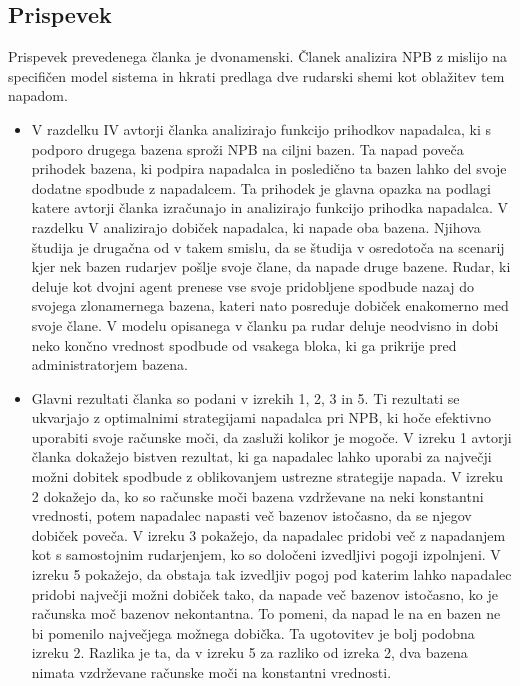 \documentclass{acm_proc_article-sp}
\begin{document}
\subsection{Prispevek}

Prispevek prevedenega članka \cite{originalarticle} je dvonamenski. Članek analizira NPB z mislijo na specifičen model sistema in hkrati predlaga dve rudarski shemi kot oblažitev tem napadom.
\begin{itemize}
	\item V razdelku IV avtorji članka \cite{originalarticle}  analizirajo funkcijo prihodkov napadalca, ki s podporo drugega bazena sproži NPB na ciljni bazen. Ta napad poveča prihodek bazena, ki podpira napadalca in posledično ta bazen lahko del svoje dodatne spodbude z napadalcem. Ta prihodek je glavna opazka na podlagi katere avtorji članka \cite{originalarticle}  izračunajo in analizirajo funkcijo prihodka napadalca. V razdelku V analizirajo dobiček napadalca, ki napade oba bazena.
	Njihova študija je drugačna od \cite{minnersdilemma} v takem smislu, da se študija v  \cite{minnersdilemma} osredotoča na scenarij kjer nek bazen rudarjev pošlje svoje člane, da napade druge bazene. Rudar, ki deluje kot dvojni agent prenese vse svoje pridobljene spodbude nazaj do svojega zlonamernega bazena, kateri nato posreduje dobiček enakomerno med svoje člane. V modelu opisanega v članku \cite{originalarticle} pa rudar deluje neodvisno in dobi neko končno vrednost spodbude od vsakega bloka, ki ga prikrije pred administratorjem bazena.
	\item Glavni rezultati članka so podani v izrekih 1, 2, 3 in 5. Ti rezultati se ukvarjajo z optimalnimi strategijami napadalca pri NPB, ki hoče efektivno uporabiti svoje računske moči, da zasluži kolikor je mogoče. V izreku 1 avtorji članka \cite{originalarticle} dokažejo bistven rezultat, ki ga napadalec lahko uporabi za največji možni dobitek spodbude z oblikovanjem ustrezne strategije napada. 
	V izreku 2 dokažejo da, ko so računske moči bazena vzdrževane na neki konstantni vrednosti, potem napadalec napasti več bazenov istočasno, da se njegov dobiček poveča.
	V izreku 3 pokažejo, da napadalec pridobi več z napadanjem kot s samostojnim rudarjenjem, ko so določeni izvedljivi pogoji izpolnjeni. V izreku 5 pokažejo, da obstaja tak izvedljiv pogoj pod katerim lahko napadalec pridobi največji možni dobiček tako, da napade več bazenov istočasno, ko je računska moč bazenov nekontantna. To pomeni, da napad le na en bazen ne bi pomenilo največjega možnega dobička. Ta ugotovitev je bolj podobna izreku 2. Razlika je ta, da v izreku 5 za razliko od izreka 2, dva bazena nimata vzdrževane računske moči na konstantni vrednosti.

\end{itemize}
\end{document}
